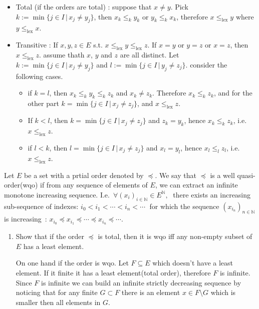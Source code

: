 \documentclass[a4paper,11pt]{exam}
\newcommand{\N}{\mathbb{N}}
\begin{document}
\begin{questions}
\begin{solution}
\begin{itemize}
				\item Total (if the orders are total) : suppose that $x \neq y$. Pick
				$k := \min \{j \in I\,|\, x_j \neq y_j\}$, then $x_k \leq_k y_k$ or $y_k \leq_k x_k$, therefore $x \leq_{\mathrm{lex}} y$ where $y \leq_{\mathrm{lex}} x$.
				
				\item Transitive : If $x,y,z \in E$ s.t. $x \leq_{\mathrm{lex}}
				y \leq_{\mathrm{lex}} z$. If $x = y$ or $y =z$ or $x = z$, then $x
				\leq_{\mathrm{lex}} z$. assume thath $x$, $y$ and $z$ are all distinct. Let $k := \min \{j \in I\,|\, x_j \neq y_j\}$
				and $l := \min \{j \in I\,|\, y_j \neq z_j\}$. consider the following cases.
				\begin{itemize}
					\item if $k = l$, then $x_k \leq_k y_k \leq_k z_k$ and $x_k \neq
					z_k$. Therefore $x_k \leq_k z_k$, and for the other part $k = \min
					\{j \in I\,|\, x_j \neq z_j\}$, and $x \leq_{\mathrm{lex}} z$.
					\item If $k < l$, then $k = \min \{j \in I\,|\, x_j \neq z_j\}$ and
					$z_k = y_k$, hence $x_k \leq_k z_k$, i.e. $x \leq_{\mathrm{lex}} z$.
					\item if $l < k$, then $l = \min \{j \in I\,|\, x_j \neq z_j\}$ and
					$x_l = y_l$, hence $x_l \leq_l z_l$, i.e. $x \leq_{\mathrm{lex}} z$.
				\end{itemize}
			\end{itemize}
		\end{solution}
		
		\question
		Let $E$ be a set with a prtial order denoted by $\preccurlyeq$.
		We say that $\preccurlyeq$ is a well quasi-order(wqo) if from any sequence of elements of $E$, we can extract an infinite monotone increasing sequence. I.e.\
		$\forall (x_i)_{i\in\N} \in E^{\N}, \; $ there exists an increasing sub-sequence of indexes: $ i_0 < i_1 < \cdots < i_n < \cdots \;$
		for which the sequence $(x_{i_n})_{n\in\N}$ is increasing~:
		$x_{i_0} \preccurlyeq x_{i_1} \preccurlyeq \cdots \preccurlyeq
		x_{i_n}\preccurlyeq \cdots$.
		
		\begin{enumerate}
			\item Show that if the order $\preccurlyeq$ is total, then it is wqo iff any non-empty subset of $E$ has a least element.
			
			\begin{solution}
				On one hand if the order is wqo. Let $F\subseteq E$ which doesn't have a least element. If it finite it has a least element(total order), therefore $F$ is infinite. Since $F$ is infinite we can build an infinite strictly decreasing sequence by noticing that for any finite $G\subset F$ there is an element $x\in F\setminus G$ which is smaller then all elements in $G$.
				

\end{solution}
\end{enumerate}
\end{questions}
\end{document}
